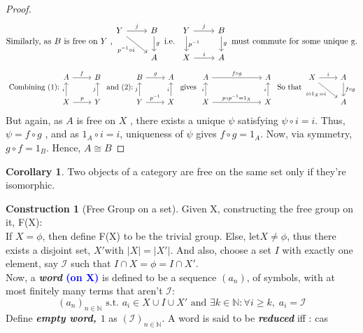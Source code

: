 \documentclass{article}
\theoremstyle{definition}
\theoremstyle{definition}
\newtheorem{corollary}{Corollary}[theorem]
\newtheorem{construction}{Construction}[theorem]
\begin{document}
\begin{proof}
	\begin{equation}
		\text{Similarly, as $ B$  is free on $ Y $ ,}
		\begin{tikzcd}
			Y \arrow{r}{j} \arrow[swap]{dr}{p^{-1} \circ i} & B  \arrow{d}{g} \\ & A
		\end{tikzcd}
		\text{ i.e. }
		\begin{tikzcd}
			Y \arrow{r}{j} \arrow{d}{p^{-1}} & B  \arrow{d}{g} \\ X \arrow{r}{i} & A
		\end{tikzcd}
		\text{ must commute for some unique g.}
	\end{equation}
	\begin{equation*}
		\text{ Combining (1):}
		\begin{tikzcd}
			A \arrow{r}{f} & B \\ X \arrow{u}{i} \arrow{r}{p} & Y\arrow{u}{j}
		\end{tikzcd}
		\text{ and (2):}
		\begin{tikzcd}
			B \arrow{r}{g} & A \\ Y \arrow{u}{j} \arrow{r}{p^{-1}} & X\arrow{u}{i}
		\end{tikzcd}
		\text{ gives }
		\begin{tikzcd}
			A \arrow{r}{f \circ g} &[4em] A \\ X \arrow{u}{i} \arrow{r}{p \circ p^{-1} = 1_X} & X\arrow{u}{i}
		\end{tikzcd}
		\text{ So that }
		\begin{tikzcd}
			X \arrow{r}{i} \arrow[swap]{dr}{i \circ 1_X = i} &A \arrow{d}{f \circ g} \\ &A
		\end{tikzcd}
	\end{equation*}
	But again, as $ A $ is free on $ X $ , there exists a unique $ \psi $ satisfying $ \psi \circ i = i $. Thus, $ \psi = f \circ g $ , and as $ 1_A \circ i = i $, uniqueness of $ \psi $ gives $ f \circ g = 1_A $. Now, via symmetry, $ g \circ f = 1_B $. Hence, $A \cong B$
\end{proof}
\begin{corollary}
	Two objects of a category are free on the same set only if they're isomorphic.
\end{corollary}

\begin{construction}[Free Group on a set]
	Given X, constructing the free group on it, F(X):\\
	If $X=\phi$, then define F(X) to be the trivial group. Else, let$X\neq \phi$, thus there exists a disjoint set, $X'$with $|X|=|X'|$.
	And also, choose a set $I$ with exactly one element, say $\mathcal{I} $ such that $I\cap X=\phi =I\cap X'$.\\
	Now, a \textbf{ \textit{word} \textcolor{blue}{(on X)}} is defined to be a sequence $(a_n)$, of symbols,
	with at most finitely many terms that aren't $\mathcal{I}$:
	\[ (a_n)_{n\in \mathbb{N}} \text{ s.t. } a_i \in X \cup I \cup X'
	\text{ and } \exists k \in \mathbb{N}: \forall i \geq k,\; a_i=\mathcal{I}   \]
	Define \textbf{\textit{empty word, $1$}} as $(\mathcal{I})_{n \in \mathbb{N}}$.
	A word is said to be \textbf{\textit{reduced}} iff :
	cas
\end{construction}
\end{document}
